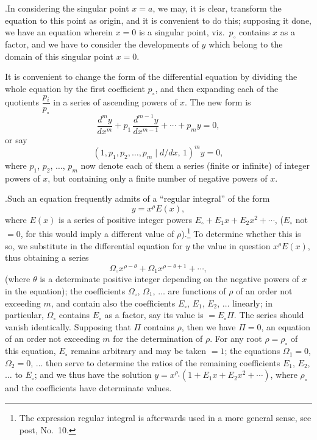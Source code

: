 \documentclass[11pt]{article}
\begin{document}
\medskip

.\quad In considering the singular point $x=a$, we may, it is clear, transform the equation to this point as origin, and it is convenient to do this; supposing it done, we have an equation wherein $x=0$ is a singular point, viz.\ $p_{\circ}$ contains $x$ as a factor, and we have to consider the developments of $y$ which belong to the domain of this singular point $x=0$.

It is convenient to change the form of the differential equation by dividing the whole equation by the first coefficient $p_{\circ}$, and then expanding each of the quotients $\dfrac{p_i}{p_{\circ}}$ in a series of ascending powers of $x$. The new form is
\[
\frac{d^m y}{dx^m} + p_1\,\frac{d^{m-1}y}{dx^{m-1}} + \dotsb + p_m y = 0,
\]
or say
\[
(1,p_1,p_2,\dotsc,p_m\mid d/dx,\,1)^m y = 0,
\]
where $p_1$, $p_2$, $\dotsc$, $p_m$ now denote each of them a series (finite or infinite) of integer powers of $x$, but containing only a finite number of negative powers of $x$.

\medskip

.\quad Such an equation frequently admits of a ``regular integral'' of the form
\[
y = x^{\rho} E(x),
\]
where $E(x)$ is a series of positive integer powers $E_{\circ} + E_1 x + E_2 x^2 + \dotsb$, ($E_{\circ}$ not $=0$, for this would imply a different value of $\rho$).\footnote{The expression regular integral is afterwards used in a more general sense, see post, No.\ 10.} To determine whether this is so, we substitute in the differential equation for $y$ the value in question $x^{\rho}E(x)$, thus obtaining a series
\[
\Omega_{\circ} x^{\rho-\theta} + \Omega_1 x^{\rho-\theta+1} + \dotsb,
\]
(where $\theta$ is a determinate positive integer depending on the negative powers of $x$ in the equation); the coefficients $\Omega_{\circ}$, $\Omega_1$, $\dotsc$ are functions of $\rho$ of an order not exceeding $m$, and contain also the coefficients $E_{\circ}$, $E_1$, $E_2$, $\dotsc$ linearly; in particular, $\Omega_{\circ}$ contains $E_{\circ}$ as a factor, say its value is $= E_{\circ}\Pi$. The series should vanish identically. Supposing that $\Pi$ contains $\rho$, then we have $\Pi=0$, an equation of an order not exceeding $m$ for the determination of $\rho$. For any root $\rho=\rho_{\circ}$ of this equation, $E_{\circ}$ remains arbitrary and may be taken $=1$; the equations $\Omega_1=0$, $\Omega_2=0$, $\dotsc$ then serve to determine the ratios of the remaining coefficients $E_1$, $E_2$, $\dotsc$ to $E_{\circ}$; and we thus have the solution $y = x^{\rho_{\circ}}(1 + E_1 x + E_2 x^2 + \dotsb)$, where $\rho_{\circ}$ and the coefficients have determinate values.
\end{document}
